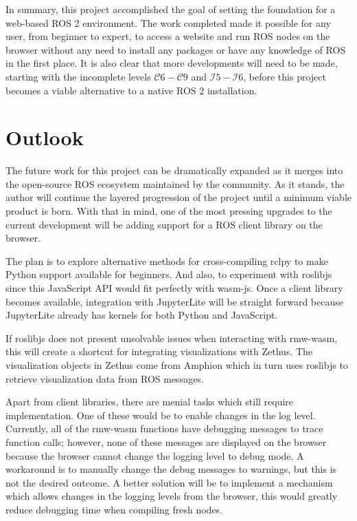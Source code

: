 In summary, this project accomplished the goal of setting the foundation for a web-based \ac{ROS} 2 environment. The work completed made it possible for any user, from beginner to expert, to access a website and run \ac{ROS} nodes on the browser without any need to install any packages or have any knowledge of \ac{ROS} in the first place. It is also clear that more developments will need to be made, starting with the incomplete levels $\mathcal{C}6-\mathcal{C}9$ and $\mathcal{I}5-\mathcal{I}6$, before this project becomes a viable alternative to a native \ac{ROS} 2 installation.


\section{Outlook}

The future work for this project can be dramatically expanded as it merges into the open-source \ac{ROS} ecosystem maintained by the community. As it stands, the author will continue the layered progression of the project until a minimum viable product is born. With that in mind, one of the most pressing upgrades to the current development will be adding support for a \ac{ROS} client library on the browser. 

The plan is to explore alternative methods for cross-compiling \textsf{rclpy} to make Python support available for beginners. And also, to experiment with \textsf{roslibjs} since this JavaScript \ac{API} would fit perfectly with \textsf{wasm-js}. Once a client library becomes available, integration with JupyterLite will be straight forward because JupyterLite already has kernels for both Python and JavaScript.

If \textsf{roslibjs} does not present unsolvable issues when interacting with \textsf{rmw-wasm}, this will create a shortcut for integrating visualizations with Zethus. The visualization objects in Zethus come from Amphion which in turn uses \textsf{roslibjs} to retrieve visualization data from \ac{ROS} messages. 

Apart from client libraries, there are menial tasks which still require implementation. One of these would be to enable changes in the log level. Currently, all of the \textsf{rmw-wasm} functions have debugging messages to trace function calls; however, none of these messages are displayed on the browser because the browser cannot change the logging level to debug mode. A workaround is to manually change the debug messages to warnings, but this is not the desired outcome. A better solution will be to implement a mechanism which allows changes in the logging levels from the browser, this would greatly reduce debugging time when compiling fresh nodes.

